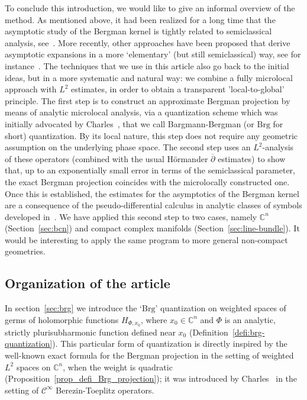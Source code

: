 \documentclass{article}
\newcommand{\Brg}{\mathrm{Brg}}
\newcommand{\dbar}{\overline\partial}
\newcommand{\Cinf}{\mathscr{C}^\infty}
\newcommand{\CM}{\mathbb{C}}
\begin{document}
To conclude this introduction, we would like to give an informal
overview of the method. As mentioned above, it had been realized for a
long time that the asymptotic study of the Bergman kernel is tightly
related to semiclassical analysis,
see~\cite{boutet-sjostrand76,zelditch98}. More recently, other
approaches have been proposed that derive asymptotic expansions in a
more `elementary' (but still semiclassical) way, see for
instance~\cite{b-b-sj-08}. The techniques that we use in this article
also go back to the initial ideas, but in a more systematic and
natural way: we combine a fully microlocal approach with $L^2$
estimates, in order to obtain a transparent 'local-to-global'
principle. The first step is to construct an approximate Bergman
projection by means of analytic microlocal analysis, via a
quantization scheme which was initially advocated by
Charles~\cite{charles-toeplitz}, that we call Bargmann-Bergman (or
$\Brg$ for short) quantization. By its local nature, this step does
not require any geometric assumption on the underlying phase
space. The second step uses an $L^2$-analysis of these operators
(combined with the usual Hörmander $\dbar$ estimates) to show that, up
to an exponentially small error in terms of the semiclassical
parameter, the exact Bergman projection coincides with the
microlocally constructed one. Once this is established, the estimates
for the asymptotics of the Bergman kernel are a consequence of the
pseudo-differential calculus in analytic classes of symbols developed
in~\cite{sj-asterisque-82}. We have applied this second step to two
cases, namely $\CM^n$ (Section~\ref{sec:bcn}) and compact complex
manifolds (Section~\ref{sec:line-bundle}). It would be interesting to
apply the same program to more general non-compact geometries.

\subsection*{Organization of the article}

In section~\ref{sec:brg} we introduce the `$\Brg$' quantization on
weighted spaces of germs of holomorphic functions $H_{\Phi,x_0}$,
where $x_0\in\CM^n$ and $\Phi$ is an analytic, strictly
plurisubharmonic function defined near $x_0$
(Definition~\ref{defi:brg-quantization}). This particular form of
quantization is directly inspired by the well-known exact formula for
the Bergman projection in the setting of weighted $L^2$ spaces on
$\CM^n$, when the weight is quadratic
(Proposition~\ref{prop_defi_Brg_projection}); it was introduced by
Charles~\cite{charles-toeplitz} in the setting of $\Cinf$
Berezin-Toeplitz operators.
\end{document}

